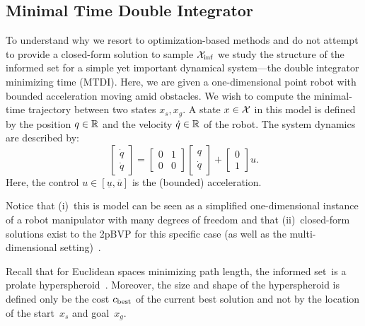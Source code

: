 \documentclass[letterpaper, 10 pt, conference]{ieeeconf}  %
\begin{document}
\subsection{Minimal Time Double Integrator}
To understand why we resort to optimization-based methods and do not attempt to provide a closed-form solution to sample $\mathcal{X}_{\rm {inf}}$ we study the structure of the informed set for a simple yet important dynamical system---the double integrator minimizing time (MTDI). 
Here, we are given a one-dimensional point robot with bounded acceleration moving amid obstacles. We wish to compute the minimal-time trajectory between two states $x_s, x_g$.
A state $x \in \mathcal{X}$ in this model is defined by 
the position $q \in \mathbb{R}$
and
the velocity $\dot{q}\in \mathbb{R}$ of the robot.
The system dynamics are described by:
\begin{equation}
\begin{bmatrix}
	\dot{q} \\
	\ddot{q}
\end{bmatrix}
=
\begin{bmatrix}
	0 & 1 \\
	0 & 0
\end{bmatrix}
\begin{bmatrix}
	{q} \\
	\dot{q}
\end{bmatrix}
+
\begin{bmatrix}
	0 \\
	1
\end{bmatrix}
u.
\end{equation}
Here, the control 
$u \in [\underline{u}, \overline{u}]$ 
is the (bounded) acceleration.


Notice that 
(i)~this is model can be seen as a simplified one-dimensional instance of a robot manipulator with many degrees of freedom and that
(ii)~closed-form solutions exist to the 2pBVP for this specific case (as well as the multi-dimensional setting)~\cite{HN10, KS14}.

%
%
Recall that for Euclidean spaces minimizing path length, the informed set~\Cinf is a prolate hyperspheroid~\cite{GSB14}.
Moreover, the size and shape of the hyperspheroid is defined only be the cost $c_{\rm best}$ of the current best solution and not by the location of the start~$x_s$ and goal~$x_g$.
\end{document}
